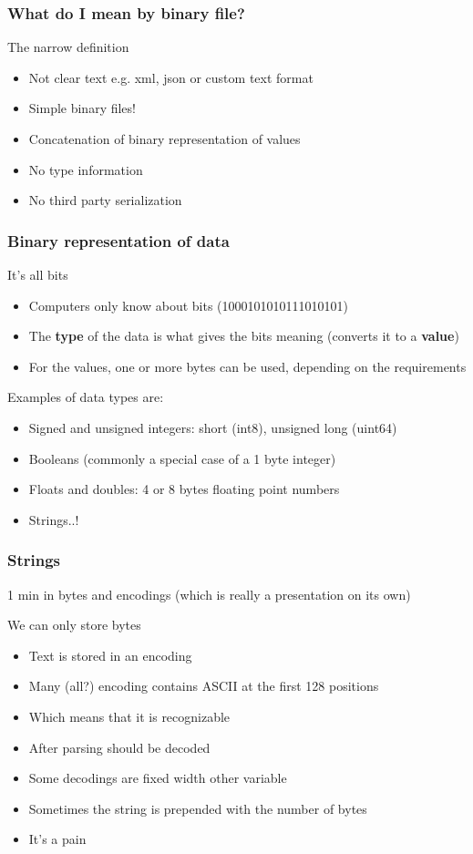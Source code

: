 \documentclass{beamer}
\begin{document}
\begin{frame}
  \frametitle{What do I mean by binary file?}
  \begin{block}{The narrow definition}
    \begin{itemize}
    \item Not clear text e.g. xml, json or custom text format
    \item Simple binary files!
    \item Concatenation of binary representation of values
    \item No type information
    \item No third party serialization
    \end{itemize}
  \end{block}
\end{frame}

\begin{frame}
  \frametitle{Binary representation of data}
  \begin{block}{It's all bits}
    \begin{itemize}
    \item Computers only know about bits (1000101010111010101)
    \item The \textbf{type} of the data is what gives the bits meaning (converts it to a \textbf{value})
    \item For the values, one or more bytes can be used, depending on the requirements
    \end{itemize}
  \end{block}
  Examples of data types are:
  \begin{itemize}
  \item Signed and unsigned integers: short (int8), unsigned long (uint64)
  \item Booleans (commonly a special case of a 1 byte integer)
  \item Floats and doubles: 4 or 8 bytes floating point numbers
  \item Strings..!
  \end{itemize}
\end{frame}

\begin{frame}
  \frametitle{Strings}
  1 min in bytes and encodings (which is really a presentation on its own)
  \begin{block}{We can only store bytes}
    \begin{itemize}
    \item Text is stored in an encoding
    \item Many (all?) encoding contains ASCII at the first 128 positions
    \item Which means that it is recognizable
    \item After parsing should be decoded
    \item Some decodings are fixed width other variable
    \item Sometimes the string is prepended with the number of bytes
    \item It's a pain
    \end{itemize}
  \end{block}
\end{frame}
\end{document}
